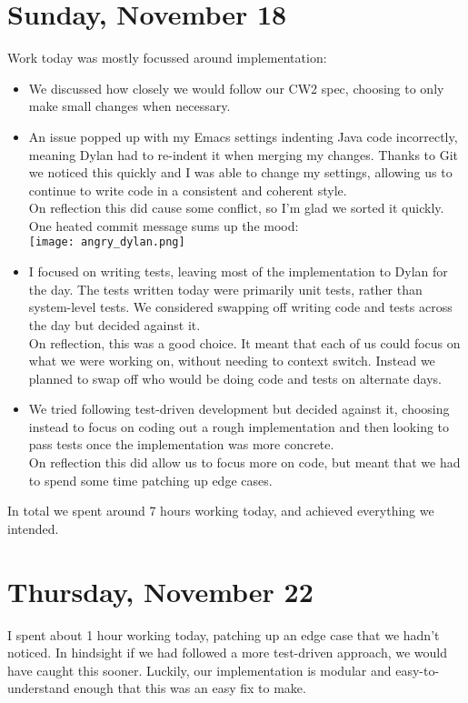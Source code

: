 \documentclass[titlepage, 12pt]{extarticle}
\begin{document}
\section{Sunday, November 18}
Work today was mostly focussed around implementation:
\begin{itemize}
\item We discussed how closely we would follow our CW2 spec, choosing to only make small changes when necessary. 
\item An issue popped up with my Emacs settings indenting Java code incorrectly, meaning Dylan had to re-indent it when merging my changes. Thanks to Git we noticed this quickly and I was able to change my settings, allowing us to continue to write code in a consistent and coherent style. \\ On reflection this did cause some conflict, so I'm glad we sorted it quickly. One heated commit message sums up the mood:\vspace{1em}\\
  \texttt{[image: angry\_dylan.png]}
\item I focused on writing tests, leaving most of the implementation to Dylan for the day. The tests written today were primarily unit tests, rather than system-level tests. We considered swapping off writing code and tests across the day but decided against it. \\ On reflection, this was a good choice. It meant that each of us could focus on what we were working on, without needing to context switch. Instead we planned to swap off who would be doing code and tests on alternate days. 
\item We tried following test-driven development but decided against it, choosing instead to focus on coding out a rough implementation and then looking to pass tests once the implementation was more concrete. \\ On reflection this did allow us to focus more on code, but meant that we had to spend some time patching up edge cases.
\end{itemize}

In total we spent around 7 hours working today, and achieved everything we intended. 

\section{Thursday, November 22}
I spent about 1 hour working today, patching up an edge case that we hadn't noticed. In hindsight if we had followed a more test-driven approach, we would have caught this sooner. Luckily, our implementation is modular and easy-to-understand enough that this was an easy fix to make.
\end{document}
